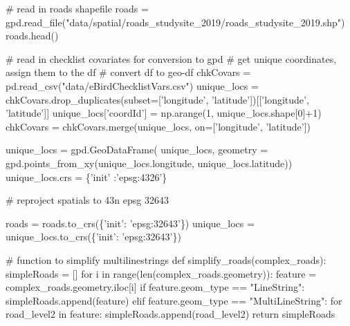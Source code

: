 \documentclass[]{article}
\newenvironment{Shaded}{}{}
\newcommand{\BuiltInTok}[1]{#1}
\newcommand{\CommentTok}[1]{\textcolor[rgb]{0.00,0.50,0.00}{#1}}
\newcommand{\ControlFlowTok}[1]{\textcolor[rgb]{0.00,0.00,1.00}{#1}}
\newcommand{\DecValTok}[1]{#1}
\newcommand{\KeywordTok}[1]{\textcolor[rgb]{0.00,0.00,1.00}{#1}}
\newcommand{\NormalTok}[1]{#1}
\newcommand{\OperatorTok}[1]{#1}
\newcommand{\StringTok}[1]{\textcolor[rgb]{0.00,0.50,0.50}{#1}}
\begin{document}
\begin{Shaded}
\begin{Highlighting}[]
\CommentTok{# read in roads shapefile}
\NormalTok{roads }\OperatorTok{=}\NormalTok{ gpd.read_file(}\StringTok{"data/spatial/roads_studysite_2019/roads_studysite_2019.shp"}\NormalTok{)}
\NormalTok{roads.head()}

\CommentTok{# read in checklist covariates for conversion to gpd}
\CommentTok{# get unique coordinates, assign them to the df}
\CommentTok{# convert df to geo-df}
\NormalTok{chkCovars }\OperatorTok{=}\NormalTok{ pd.read_csv(}\StringTok{"data/eBirdChecklistVars.csv"}\NormalTok{)}
\NormalTok{unique_locs }\OperatorTok{=}\NormalTok{ chkCovars.drop_duplicates(subset}\OperatorTok{=}\NormalTok{[}\StringTok{'longitude'}\NormalTok{,}
                                         \StringTok{'latitude'}\NormalTok{])[[}\StringTok{'longitude'}\NormalTok{, }\StringTok{'latitude'}\NormalTok{]]}
\NormalTok{unique_locs[}\StringTok{'coordId'}\NormalTok{] }\OperatorTok{=}\NormalTok{ np.arange(}\DecValTok{1}\NormalTok{, unique_locs.shape[}\DecValTok{0}\NormalTok{]}\OperatorTok{+}\DecValTok{1}\NormalTok{)}
\NormalTok{chkCovars }\OperatorTok{=}\NormalTok{ chkCovars.merge(unique_locs, on}\OperatorTok{=}\NormalTok{[}\StringTok{'longitude'}\NormalTok{, }\StringTok{'latitude'}\NormalTok{])}

\NormalTok{unique_locs }\OperatorTok{=}\NormalTok{ gpd.GeoDataFrame(}
\NormalTok{unique_locs, }
\NormalTok{geometry }\OperatorTok{=}\NormalTok{ gpd.points_from_xy(unique_locs.longitude, unique_locs.latitude))}
\NormalTok{unique_locs.crs }\OperatorTok{=}\NormalTok{ \{}\StringTok{'init'}\NormalTok{ :}\StringTok{'epsg:4326'}\NormalTok{\}}

\CommentTok{# reproject spatials to 43n epsg 32643}

\NormalTok{roads }\OperatorTok{=}\NormalTok{ roads.to_crs(\{}\StringTok{'init'}\NormalTok{: }\StringTok{'epsg:32643'}\NormalTok{\})}
\NormalTok{unique_locs }\OperatorTok{=}\NormalTok{ unique_locs.to_crs(\{}\StringTok{'init'}\NormalTok{: }\StringTok{'epsg:32643'}\NormalTok{\})}


\CommentTok{# function to simplify multilinestrings}
\KeywordTok{def}\NormalTok{ simplify_roads(complex_roads):}
\NormalTok{    simpleRoads }\OperatorTok{=}\NormalTok{ []}
    \ControlFlowTok{for}\NormalTok{ i }\KeywordTok{in} \BuiltInTok{range}\NormalTok{(}\BuiltInTok{len}\NormalTok{(complex_roads.geometry)):}
\NormalTok{        feature }\OperatorTok{=}\NormalTok{ complex_roads.geometry.iloc[i]}
        \ControlFlowTok{if}\NormalTok{ feature.geom_type }\OperatorTok{==} \StringTok{"LineString"}\NormalTok{:}
\NormalTok{            simpleRoads.append(feature)}
        \ControlFlowTok{elif}\NormalTok{ feature.geom_type }\OperatorTok{==} \StringTok{"MultiLineString"}\NormalTok{:}
            \ControlFlowTok{for}\NormalTok{ road_level2 }\KeywordTok{in}\NormalTok{ feature:}
\NormalTok{                simpleRoads.append(road_level2)}
    \ControlFlowTok{return}\NormalTok{ simpleRoads}



\end{Highlighting}
\end{Shaded}
\end{document}

